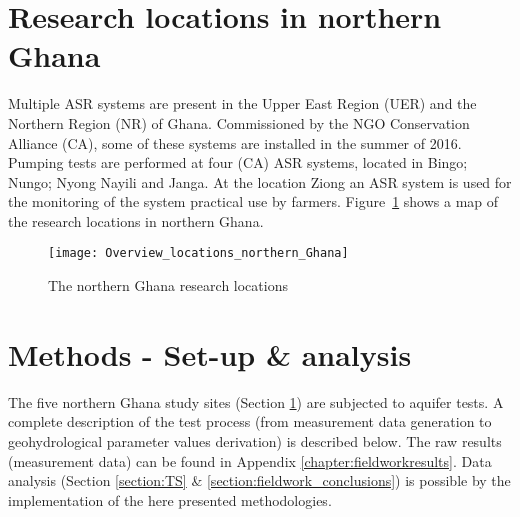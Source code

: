 %
%

\section{Research locations in northern Ghana}
\label{section:research_locations}
Multiple ASR systems are present in the Upper East Region (UER) and the Northern Region (NR) of Ghana. Commissioned by the NGO Conservation Alliance (CA), some of these systems are installed in the summer of 2016. Pumping tests are performed at four (CA) ASR systems, located in Bingo; Nungo; Nyong Nayili and Janga. At the location Ziong an ASR system is used for the monitoring of the system practical use by farmers. Figure~\ref{fig:Overviewlocations} shows a map of the research locations in northern Ghana. \\

\begin{figure}[ht]
 \centering
 \texttt{[image: Overview\_locations\_northern\_Ghana]}
 \captionsetup{justification=centering} 
 \caption{The northern Ghana research locations}
 \label{fig:Overviewlocations}
\end{figure}

\section{Methods - Set-up \& analysis}
\label{section:Methods_fieldwork}
The five northern Ghana study sites (Section \ref{section:research_locations}) are subjected to aquifer tests. A complete description of the test process (from measurement data generation to geohydrological parameter values derivation) is described below. The raw results (measurement data) can be found in Appendix \ref{chapter:fieldworkresults}. Data analysis (Section \ref{section:TS} \& \ref{section:fieldwork_conclusions}) is possible by the implementation of the here presented methodologies.


